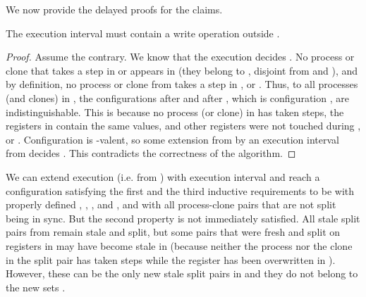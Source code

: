 We now provide the delayed proofs for the claims.
\begin{claim}
\label{clm:alphaout}
The execution interval  must contain a write operation outside .		 
\end{claim}
\begin{proof}
Assume the contrary.
We know that the execution  decides .
No process or clone that takes a step in  or  appears in 
  (they belong to , disjoint from  and ),  
  and by definition, no process or clone from  takes a step in ,  or . 
Thus, to all processes (and clones) in , 
  the configurations after  and after ,
  which is configuration , are indistinguishable.
This is because no process (or clone) in  has taken steps, the registers in  contain the same values, 
  and other registers were not touched during ,  or .
Configuration  is -valent, so some extension from  by 
  an execution interval from  decides .
This contradicts the correctness of the algorithm.
\end{proof}
\begin{claim}
\label{clm:casean}
We can extend execution  (i.e. from ) with execution interval  and reach a configuration 
  satisfying the first and the third inductive requirements to be  
  with properly defined , , ,  and ,
  and with all process-clone pairs that are not split being in sync.
But the second property is not immediately satisfied.
All stale split pairs from  remain stale and split, but some pairs that were fresh and split on registers 
  in  may have become stale in  
  (because neither the process nor the clone in the split pair has taken steps while the register has been overwritten in ). 
However, these can be the only new stale split pairs in  and they do not belong to the new sets .
\end{claim}
